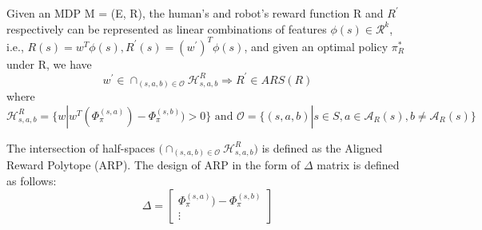 \begin{lemma}
\label{lemma:1}
    Given an MDP M = (E, R), the human’s and robot's reward function R and $R^{'}$ respectively can be represented as linear combinations 
    of features $\phi(s) \in \mathcal{R}^{k}$, i.e., $R(s) = w^{T}\phi(s), R^{'}(s) = (w^{'})^{T}\phi(s)$, and given an optimal 
    policy $\pi^{*}_{R}$ under R, we have
        \begin{equation*}
            w ^{'} \in \cap_{(s,a,b) \in \mathcal{O}} \mathcal{H}^{R}_{s,a,b} \Rightarrow R^{'} \in ARS(R) 
        \end{equation*}  
    where 
    \begin{equation*}
        \mathcal{H}^{R}_{s,a,b} = \{w | w^{T}(\Phi_{\pi}^{(s,a)}) - \Phi_{\pi}^{(s,b)}) > 0\} \text{ and } \mathcal{O} = \{(s,a,b) | s \in S, a \in \mathcal{A}_{R}(s), b \neq \mathcal{A}_{R}(s)\}
    \end{equation*}
    
\end{lemma}
\begin{defn}
    The intersection of half-spaces $\big( \cap_{(s,a,b) \in \mathcal{O}} \mathcal{H}^{R}_{s,a,b} \big)$ is defined as the Aligned Reward Polytope (ARP). The design of ARP in the form of $\Delta$ matrix is defined as follows:
    \begin{equation*}
    \Delta = 
    \begin{bmatrix}
        \Phi_{\pi}^{(s,a)}) - \Phi_{\pi}^{(s,b)} \\
        \vdots
     \end{bmatrix}
     \end{equation*}
\end{defn}

